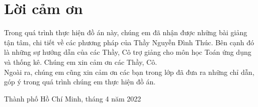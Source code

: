 \documentclass[a4paper]{article}
\begin{document}
\newpage

\section*{Lời cảm ơn}
Trong quá trình thực hiện đồ án này, chúng em đã nhận được những bài giảng tận tâm, chi tiết về các phương pháp của Thầy Nguyễn Đình Thúc. Bên cạnh đó là những sự hướng dẫn của các Thầy, Cô trợ giảng cho môn học Toán ứng dụng và thống kê. Chúng em xin cảm ơn các Thầy, Cô.\\
Ngoài ra, chúng em cũng xin cảm ơn các bạn trong lớp đã đưa ra những chỉ dẫn, góp ý trong quá trình chúng em thực hiện đồ án.
\begin{flushright}
Thành phố Hồ Chí Minh, tháng 4 năm 2022
\end{flushright} 
\end{document}
